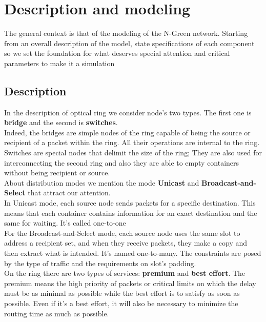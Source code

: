 \documentclass{article}
\begin{document}
\tableofcontents
\pagebreak
\section{Description and modeling}
The general context is that of the modeling of the N-Green network. Starting from an overall description of the model, state specifications of each component so we set the foundation for what deserves special attention and critical parameters to make it a simulation


\subsection{Description}
In the description of optical ring we consider node's two types. The first one is \textbf{bridge} and the second is\textbf{ switches}.\\
Indeed, the bridges are simple nodes of the ring capable of being the source or recipient of a packet within the ring. All their operations are internal to the ring. Switches are special nodes that delimit the size of the ring; They are also used for interconnecting the second ring and also they are able to empty containers without being recipient or source.\\ 

About  distribution modes we  mention the mode \textbf{Unicast} and \textbf{Broadcast-and-Select} that attract our attention.\\  In Unicast mode, each source node sends packets for a specific destination. This means that each container contains information for an exact destination and the same for waiting. It's called one-to-one\\For the Broadcast-and-Select mode, each source node uses the same slot to address a recipient set, and when they receive packets, they make a copy and then extract what is intended. It's named  one-to-many. The constraints are posed by the type of traffic and the requirements on slot's padding.\\ 

On the ring there are two types of services: \textbf{premium} and \textbf{best effort}. The premium means the high priority of packets or critical limits on which the delay must be as minimal as possible while the best effort is to satisfy as soon as possible. Even if it's a best effort, it will also be necessary to minimize the routing time as much as possible.\\
\end{document}
